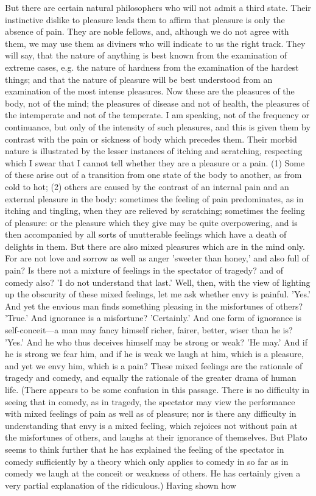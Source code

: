 \documentclass[11pt,letter]{article}
\begin{document}
\par  But there are certain natural philosophers who will not admit a third state. Their instinctive dislike to pleasure leads them to affirm that pleasure is only the absence of pain. They are noble fellows, and, although we do not agree with them, we may use them as diviners who will indicate to us the right track. They will say, that the nature of anything is best known from the examination of extreme cases, e.g. the nature of hardness from the examination of the hardest things; and that the nature of pleasure will be best understood from an examination of the most intense pleasures. Now these are the pleasures of the body, not of the mind; the pleasures of disease and not of health, the pleasures of the intemperate and not of the temperate. I am speaking, not of the frequency or continuance, but only of the intensity of such pleasures, and this is given them by contrast with the pain or sickness of body which precedes them. Their morbid nature is illustrated by the lesser instances of itching and scratching, respecting which I swear that I cannot tell whether they are a pleasure or a pain. (1) Some of these arise out of a transition from one state of the body to another, as from cold to hot; (2) others are caused by the contrast of an internal pain and an external pleasure in the body: sometimes the feeling of pain predominates, as in itching and tingling, when they are relieved by scratching; sometimes the feeling of pleasure: or the pleasure which they give may be quite overpowering, and is then accompanied by all sorts of unutterable feelings which have a death of delights in them. But there are also mixed pleasures which are in the mind only. For are not love and sorrow as well as anger 'sweeter than honey,' and also full of pain? Is there not a mixture of feelings in the spectator of tragedy? and of comedy also? 'I do not understand that last.' Well, then, with the view of lighting up the obscurity of these mixed feelings, let me ask whether envy is painful. 'Yes.' And yet the envious man finds something pleasing in the misfortunes of others? 'True.' And ignorance is a misfortune? 'Certainly.' And one form of ignorance is self-conceit—a man may fancy himself richer, fairer, better, wiser than he is? 'Yes.' And he who thus deceives himself may be strong or weak? 'He may.' And if he is strong we fear him, and if he is weak we laugh at him, which is a pleasure, and yet we envy him, which is a pain? These mixed feelings are the rationale of tragedy and comedy, and equally the rationale of the greater drama of human life. (There appears to be some confusion in this passage. There is no difficulty in seeing that in comedy, as in tragedy, the spectator may view the performance with mixed feelings of pain as well as of pleasure; nor is there any difficulty in understanding that envy is a mixed feeling, which rejoices not without pain at the misfortunes of others, and laughs at their ignorance of themselves. But Plato seems to think further that he has explained the feeling of the spectator in comedy sufficiently by a theory which only applies to comedy in so far as in comedy we laugh at the conceit or weakness of others. He has certainly given a very partial explanation of the ridiculous.) Having shown how 
\end{document}
